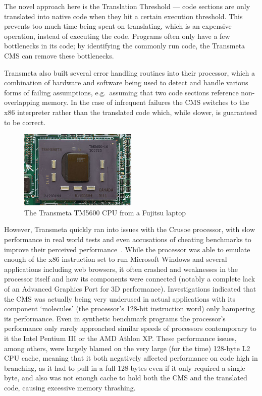 The novel approach here is the Translation Threshold --- code sections are only
translated into native code when they hit a certain execution threshold. This
prevents too much time being spent on translating, which is an expensive
operation, instead of executing the code. Programs often only have a few
bottlenecks in its code; by identifying the commonly run code, the Transmeta CMS
can remove these bottlenecks.

Transmeta also built several error handling routines into their processor, which
a combination of hardware and software being used to detect and handle various
forms of failing assumptions, e.g.\ assuming that two code sections reference
non-overlapping memory. In the case of infrequent failures the CMS switches to
the x86 interpreter rather than the translated code which, while slower, is
guaranteed to be correct.

\begin{figure}
  \includegraphics[width=0.5\textwidth]{imgs/Transmeta_TM5600}
  \caption{The Transmeta TM5600 CPU from a Fujitsu laptop}
\end{figure}

However, Transmeta quickly ran into issues with the Crusoe processor, with slow
performance in real world tests and even accusations of cheating benchmarks to
improve their perceived performance~\cite{TrackingTransmetaCrusoe}. While the
processor was able to emulate enough of the x86 instruction set to run Microsoft
Windows and several applications including web browsers, it often crashed and
weaknesses in the processor itself and how its components were connected
(notably a complete lack of an Advanced Graphics Port for 3D performance).
Investigations indicated that the CMS was actually being very underused in
actual applications with its component `molecules' (the processor's 128-bit
instruction word) only hampering its performance. Even in synthetic benchmark
programs the processor's performance only rarely approached similar speeds of
processors contemporary to it the Intel Pentium III or the AMD Athlon XP\@.
These performance issues, among others, were largely blamed on the very large
(for the time) 128-byte L2 CPU cache, meaning that it both negatively affected
performance on code high in branching, as it had to pull in a full 128-bytes
even if it only required a single byte, and also was not enough cache to hold
both the CMS and the translated code, causing excessive memory thrashing.

